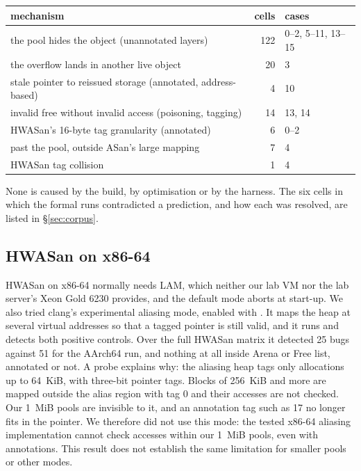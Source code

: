 \begin{center}\small
\begin{tabular}{lrl}
\toprule
mechanism & cells & cases \\
\midrule
the pool hides the object (unannotated layers) & 122 & 0--2, 5--11, 13--15 \\
the overflow lands in another live object & 20 & 3 \\
stale pointer to reissued storage (annotated, address-based) & 4 & 10 \\
invalid free without invalid access (poisoning, tagging) & 14 & 13, 14 \\
HWASan's 16-byte tag granularity (annotated) & 6 & 0--2 \\
past the pool, outside ASan's large mapping & 7 & 4 \\
HWASan tag collision & 1 & 4 \\
\bottomrule
\end{tabular}
\end{center}

None is caused by the build, by optimisation or by the harness. The six cells in which the formal runs contradicted a prediction, and how each was resolved, are listed in \S\ref{sec:corpus}.

\subsection{HWASan on x86-64}
\label{sec:hwasan-x86}

HWASan on x86-64 normally needs LAM, which neither our lab VM nor the lab server's Xeon Gold 6230 provides, and the default mode aborts at start-up. We also tried clang's experimental aliasing mode, enabled with \allowbreak{}. It maps the heap at several virtual addresses so that a tagged pointer is still valid, and it runs and detects both positive controls. Over the full HWASan matrix it detected 25 bugs against 51 for the AArch64 run, and nothing at all inside Arena or Free list, annotated or not. A probe explains why: the aliasing heap tags only allocations up to 64~KiB, with three-bit pointer tags. Blocks of 256~KiB and more are mapped outside the alias region with tag 0 and their accesses are not checked. Our 1~MiB pools are invisible to it, and an annotation tag such as 17 no longer fits in the pointer. We therefore did not use this mode: the tested x86-64 aliasing implementation cannot check accesses within our 1~MiB pools, even with annotations. This result does not establish the same limitation for smaller pools or other modes.
